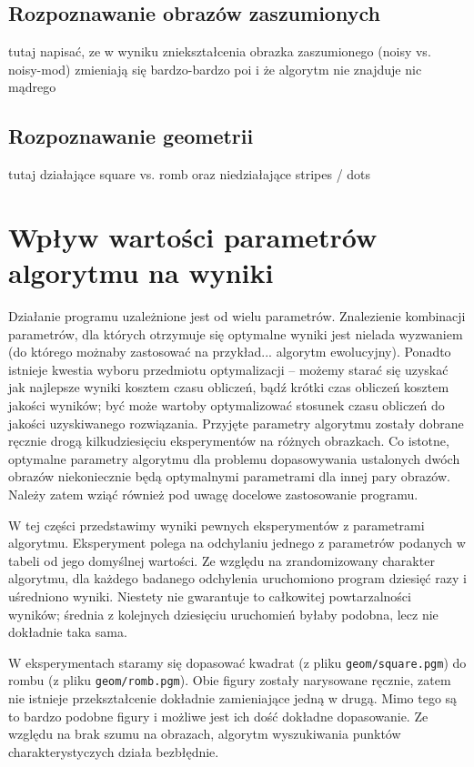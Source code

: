 \documentclass[a4paper,12pt,leqno]{article}
\begin{document}
\subsection{Rozpoznawanie obrazów zaszumionych}
tutaj napisać, ze w wyniku zniekształcenia obrazka zaszumionego (noisy vs. noisy-mod) zmieniają się bardzo-bardzo poi i że algorytm nie znajduje nic mądrego

\subsection{Rozpoznawanie geometrii}
tutaj działające square vs. romb oraz niedziałające stripes / dots


\section{Wpływ wartości parametrów algorytmu na wyniki}

Działanie programu uzależnione jest od wielu parametrów. Znalezienie kombinacji parametrów, dla których otrzymuje się optymalne wyniki jest nielada
wyzwaniem (do którego możnaby zastosować na przykład... algorytm ewolucyjny). Ponadto istnieje kwestia wyboru przedmiotu optymalizacji -- możemy starać
się uzyskać jak najlepsze wyniki kosztem czasu obliczeń, bądź krótki czas obliczeń kosztem jakości wyników; być może wartoby optymalizować stosunek
czasu obliczeń do jakości uzyskiwanego rozwiązania. Przyjęte parametry algorytmu zostały dobrane ręcznie drogą kilkudziesięciu eksperymentów na
różnych obrazkach. Co istotne, optymalne parametry algorytmu dla problemu dopasowywania ustalonych dwóch obrazów niekoniecznie będą optymalnymi
parametrami dla innej pary obrazów. Należy zatem wziąć również pod uwagę docelowe zastosowanie programu. 

W tej części przedstawimy wyniki pewnych eksperymentów z parametrami algorytmu. Eksperyment polega na odchylaniu jednego z parametrów podanych w 
tabeli od jego domyślnej wartości. Ze względu na zrandomizowany charakter algorytmu, dla każdego badanego odchylenia uruchomiono program dziesięć
razy i uśredniono wyniki. Niestety nie gwarantuje to całkowitej powtarzalności wyników; średnia z kolejnych dziesięciu uruchomień byłaby podobna,
lecz nie dokładnie taka sama.

W eksperymentach staramy się dopasować kwadrat (z pliku \texttt{geom/square.pgm}) do rombu (z pliku \texttt{geom/romb.pgm}). Obie figury zostały
narysowane ręcznie, zatem nie istnieje przekształcenie dokładnie zamieniające jedną w drugą. Mimo tego są to bardzo podobne figury i możliwe jest
ich dość dokładne dopasowanie. Ze względu na brak szumu na obrazach, algorytm wyszukiwania punktów charakterystyczych działa bezbłędnie.
\end{document}
